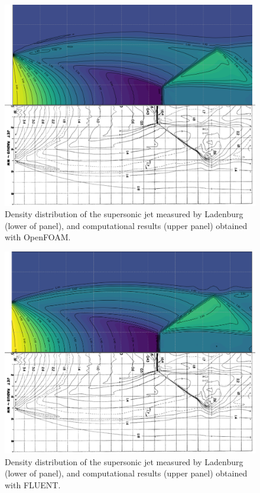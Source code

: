 \documentclass[12pt]{article}
\begin{document}
\begin{figure}[H]
    \centering
    \includegraphics[width=0.83\linewidth]{figs/stacked_rho_OF_vs_EXP_viridis.png}
    \caption{Density distribution of the supersonic jet measured by Ladenburg~\cite{ladenburg1949interferometric} (lower of panel), and computational results (upper panel) obtained with OpenFOAM. %
    }
    \label{fig:rho_OF_vs_EXP_viridis}
\end{figure}
%
\vspace{-0.5cm}
%
\begin{figure}[H]
    \centering
    \includegraphics[width=0.83\linewidth]{figs/stacked_rho_FLUENT_vs_EXP_viridis.png}
    \caption{Density distribution of the supersonic jet measured by Ladenburg~\cite{ladenburg1949interferometric} (lower of panel), and computational results (upper panel) obtained with FLUENT. %
    }
    \label{fig:rho_FLUENT_vs_EXP_viridis}
\end{figure}
\end{document}
